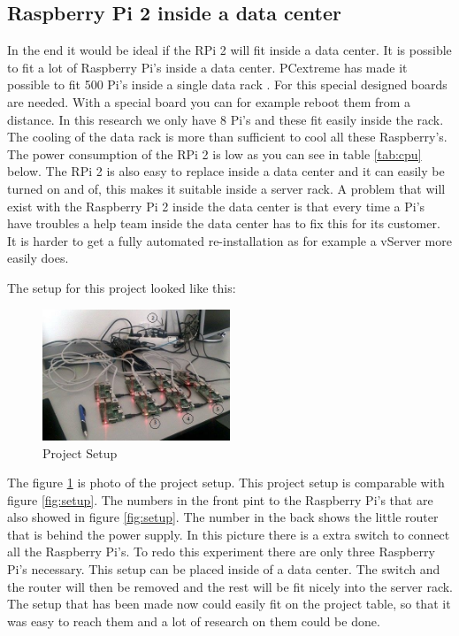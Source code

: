 \documentclass{sig-alternate-br}
\begin{document}
\subsection{Raspberry Pi 2 inside a data center}

In the end it would be ideal if the RPi 2 will fit inside a data center. It is possible to fit a lot of Raspberry Pi's inside a data center. PCextreme has made it possible to fit 500 Pi's inside a single data rack \cite{Pcextreme}. For this special designed boards are needed. With a special board you can for example reboot them from a distance. \newline In this research we only have 8 Pi's and these fit easily inside the rack. The cooling of the data rack is more than sufficient to cool all these Raspberry's. The power consumption of the RPi 2 is low as you can see in table \ref{tab:cpu} below. The RPi 2 is also easy to replace inside a data center and it can easily be turned on and of, this makes it suitable inside a server rack. A problem that will exist with the Raspberry Pi 2 inside the data center is that every time a Pi's have troubles a help team inside the data center has to fix this for its customer. It is harder to get  a fully automated re-installation as for example a vServer more easily does. 

The setup for this project looked like this:
\begin{figure}[H]
	\centering 
	\includegraphics[width=0.50\textwidth]{setup.jpg}
	\caption{Project Setup}
	\label{fig:projectsetup} %
\end{figure}
The figure \ref{fig:projectsetup} is photo of the project setup. This project setup is comparable with figure \ref{fig:setup}. The numbers in the front pint to the Raspberry Pi's that are also showed in figure \ref{fig:setup}. The number in the back shows the little router that is behind the power supply. In this picture there is a extra switch to connect all the Raspberry Pi's. To redo this experiment there are only three Raspberry Pi's necessary. \newline 
This setup can be placed inside of a data center. The switch and the router will then be removed and the rest will be fit nicely into the server rack. The setup that has been made now could easily fit on the project table, so that it was easy to reach them and a lot of research on them could be done. 
\end{document}
